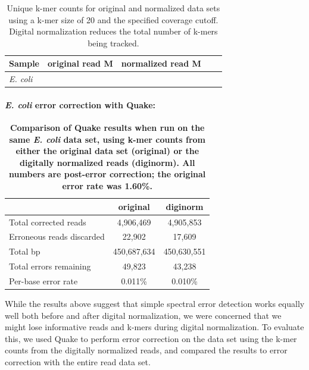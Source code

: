 \documentclass{article}
\begin{document}
\begin{table}
\begin{tabular}{|l|c|c|c|c|}
\hline
Sample              & original read M & normalized read M \\
\hline
{\em E. coli}       &            & \\
\hline
\end{tabular}

\caption{Unique k-mer counts for original and normalized data sets using a
  k-mer size of 20 and the specified coverage cutoff.  Digital
  normalization reduces the total number of k-mers being tracked.}

\label{tab:kmer_counts}
\end{table}


\paragraph{{\em E. coli} error correction with Quake:}


\begin{table}
\begin{tabular}{|l|c|c|}
\hline
                                 & original    & diginorm \\
\hline
Total corrected reads            & 4,906,469   & 4,905,853 \\
Erroneous reads discarded        & 22,902      & 17,609 \\
Total bp                         & 450,687,634 & 450,630,551 \\
Total errors remaining           & 49,823      & 43,238 \\
Per-base error rate              & 0.011\%     & 0.010\% \\
\hline
\end{tabular}

\caption{{\bf Comparison of Quake results when run on the same {\em
      E. coli} data set, using k-mer counts from either the original
    data set (original) or the digitally normalized reads
    (diginorm).  All numbers are post-error correction; the original
    error rate was 1.60\%.}}

\label{tab:quake_ecoli}
\end{table}

While the results above suggest that simple spectral error detection
works equally well both before and after digital normalization, we
were concerned that we might lose informative reads and k-mers during
digital normalization.  To evaluate this, we used Quake to perform
error correction on the data set using the k-mer counts from the
digitally normalized reads, and compared the results to error
correction with the entire read data set.
\end{document}
